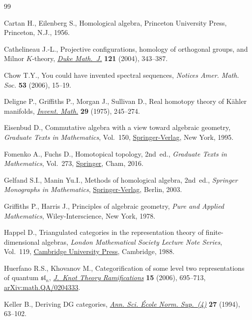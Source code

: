 \begin{thebibliography}{99}
\footnotesize\itemsep=0pt

Cartan H., Eilenberg S., Homological algebra, Princeton University Press,
 Princeton, N.J., 1956.

Cathelineau J.-L., Projective configurations, homology of orthogonal groups, and
 {M}ilnor {$K$}-theory, \href{https://doi.org/10.1215/S0012-7094-04-12125-6}{\textit{Duke Math.~J.}} \textbf{121} (2004), 343--387.

Chow T.Y., You could have invented spectral sequences, \textit{Notices Amer.
 Math. Soc.} \textbf{53} (2006), 15--19.

Deligne P., Griffiths P., Morgan J., Sullivan D., Real homotopy theory of
 {K}\"{a}hler manifolds, \href{https://doi.org/10.1007/BF01389853}{\textit{Invent. Math.}} \textbf{29} (1975), 245--274.

Eisenbud D., Commutative algebra with a view toward algebraic geometry,
 \textit{Graduate Texts in Mathematics}, Vol.~150, \href{https://doi.org/10.1007/978-1-4612-5350-1}{Springer-Verlag}, New York,
 1995.

Fomenko A., Fuchs D., Homotopical topology, 2nd~ed., \textit{Graduate Texts in
 Mathematics}, Vol.~273, \href{https://doi.org/10.1007/978-3-319-23488-5}{Springer}, Cham, 2016.

Gelfand S.I., Manin Yu.I., Methods of homological algebra, 2nd~ed., \textit{Springer
 Monographs in Mathematics}, \href{https://doi.org/10.1007/978-3-662-12492-5}{Springer-Verlag}, Berlin, 2003.

Griffiths P., Harris J., Principles of algebraic geometry, \textit{Pure and Applied Mathematics}, Wiley-Interscience, New York, 1978.

Happel D., Triangulated categories in the representation theory of
 finite-dimensional algebras, \textit{London Ma\-the\-matical Society Lecture Note
 Series}, Vol.~119, \href{https://doi.org/10.1017/CBO9780511629228}{Cambridge University Press}, Cambridge, 1988.

Huerfano R.S., Khovanov M., Categorification of some level two representations
 of quantum {$\mathfrak{sl}_n$}, \href{https://doi.org/10.1142/S0218216506004713}{\textit{J.~Knot Theory Ramifications}} \textbf{15} (2006), 695--713, \href{https://arxiv.org/abs/math.QA/0204333}{arXiv:math.QA/0204333}.

Keller B., Deriving {DG} categories, \href{https://doi.org/10.24033/asens.1689}{\textit{Ann. Sci. \'Ecole Norm. Sup.~(4)}} \textbf{27} (1994), 63--102.


\end{thebibliography}
